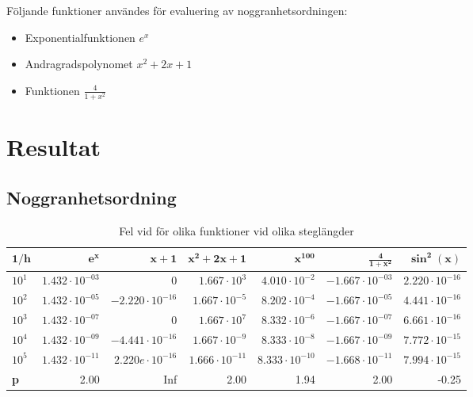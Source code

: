 \documentclass[a4paper,titlepage]{article}
\begin{document}
Följande funktioner användes för evaluering av noggranhetsordningen:

\begin{itemize}
    \item Exponentialfunktionen $e^x$
    \item Andragradspolynomet $x^2 + 2x + 1$
    \item Funktionen $\frac{4}{1 + x^2}$
\end{itemize}

\section{Resultat}

\subsection{Noggranhetsordning}

\begin{table}[h]
    \begin{tabular}{l | r | r | r | r | r | r}
        $\mathbf{1/h}$ & $\mathbf{e^x}$ & $\mathbf{x + 1}$ & $\mathbf{x^2 + 2x + 1}$ & $\mathbf{x^{100}}$ & $\mathbf{\frac{4}{1 + x^2}}$ & $\mathbf{\sin^2(x)}$ \\ \hline
        $10^1$         & $1.432 \cdot 10^{-03}$ & $0                    $  & $1.667 \cdot 10^{3}  $ & $4.010 \cdot 10^{-2} $ & $-1.667 \cdot 10^{-03}$ & $2.220 \cdot 10^{-16}$ \\
        $10^2$         & $1.432 \cdot 10^{-05}$ & $-2.220 \cdot 10^{-16}$  & $1.667 \cdot 10^{-5} $ & $8.202 \cdot 10^{-4} $ & $-1.667 \cdot 10^{-05}$ & $4.441 \cdot 10^{-16}$ \\
        $10^3$         & $1.432 \cdot 10^{-07}$ & $0                    $  & $1.667 \cdot 10^{7}  $ & $8.332 \cdot 10^{-6} $ & $-1.667 \cdot 10^{-07}$ & $6.661 \cdot 10^{-16}$ \\
        $10^4$         & $1.432 \cdot 10^{-09}$ & $-4.441 \cdot 10^{-16}$  & $1.667 \cdot 10^{-9} $ & $8.333 \cdot 10^{-8} $ & $-1.667 \cdot 10^{-09}$ & $7.772 \cdot 10^{-15}$ \\
        $10^5$         & $1.432 \cdot 10^{-11}$ & $2.220e \cdot 10^{-16}$  & $1.666 \cdot 10^{-11}$ & $8.333 \cdot 10^{-10}$ & $-1.668 \cdot 10^{-11}$ & $7.994 \cdot 10^{-15}$ \\ \hline
        \textbf{p}     & 2.00                   & Inf                      & 2.00                   & 1.94                   & 2.00                    & -0.25 \\
    \end{tabular}
    \caption{Fel vid för olika funktioner vid olika steglängder}
    \label{tab:errors}
\end{table}
\end{document}
